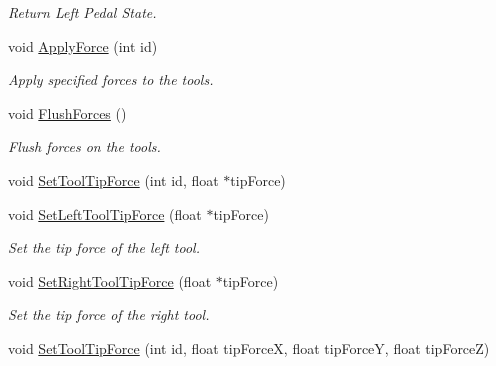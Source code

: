 \begin{DoxyCompactItemize}
\begin{DoxyCompactList}\small\item\em Return Left Pedal State. \item\end{DoxyCompactList}\item 
void \hyperlink{classvtkIHP_a541bcaa9e51b0a6a8b727ba8c7fbfc82}{ApplyForce} (int id)
\begin{DoxyCompactList}\small\item\em Apply specified forces to the tools. \item\end{DoxyCompactList}\item 
\hypertarget{classvtkIHP_a2e8f7a4172f259517554b3779b3b08b2}{
void \hyperlink{classvtkIHP_a2e8f7a4172f259517554b3779b3b08b2}{FlushForces} ()}
\label{classvtkIHP_a2e8f7a4172f259517554b3779b3b08b2}

\begin{DoxyCompactList}\small\item\em Flush forces on the tools. \item\end{DoxyCompactList}\item 
void \hyperlink{classvtkIHP_a6d991672b0fa06861ecc7e7efcfd5b98}{SetToolTipForce} (int id, float $\ast$tipForce)
\item 
\hypertarget{classvtkIHP_ad39a01ad20cc9eab9fca84979f211653}{
void \hyperlink{classvtkIHP_ad39a01ad20cc9eab9fca84979f211653}{SetLeftToolTipForce} (float $\ast$tipForce)}
\label{classvtkIHP_ad39a01ad20cc9eab9fca84979f211653}

\begin{DoxyCompactList}\small\item\em Set the tip force of the left tool. \item\end{DoxyCompactList}\item 
\hypertarget{classvtkIHP_a413aeb8d1cee56b4b0460757d2622a8f}{
void \hyperlink{classvtkIHP_a413aeb8d1cee56b4b0460757d2622a8f}{SetRightToolTipForce} (float $\ast$tipForce)}
\label{classvtkIHP_a413aeb8d1cee56b4b0460757d2622a8f}

\begin{DoxyCompactList}\small\item\em Set the tip force of the right tool. \item\end{DoxyCompactList}\item 
\hypertarget{classvtkIHP_ad1d9fa9dfce5ea9576ee83bfea54db6d}{
void \hyperlink{classvtkIHP_ad1d9fa9dfce5ea9576ee83bfea54db6d}{SetToolTipForce} (int id, float tipForceX, float tipForceY, float tipForceZ)}
\label{classvtkIHP_ad1d9fa9dfce5ea9576ee83bfea54db6d}


\end{DoxyCompactItemize}
